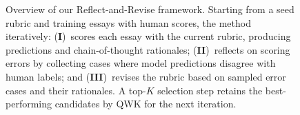 \begin{figure}[t]
{\begin{tikzpicture}[>=Stealth, font=\small]
\end{tikzpicture}%
}
\caption{Overview of our Reflect-and-Revise framework. Starting from a seed rubric and training essays with human scores, the method iteratively: (\textbf{I})~scores each essay with the current rubric, producing predictions and chain-of-thought rationales; (\textbf{II})~reflects on scoring errors by collecting cases where model predictions disagree with human labels; and (\textbf{III})~revises the rubric based on sampled error cases and their rationales. A top-$K$ selection step retains the best-performing candidates by QWK for the next iteration.}
\label{fig:overview}
\end{figure}

